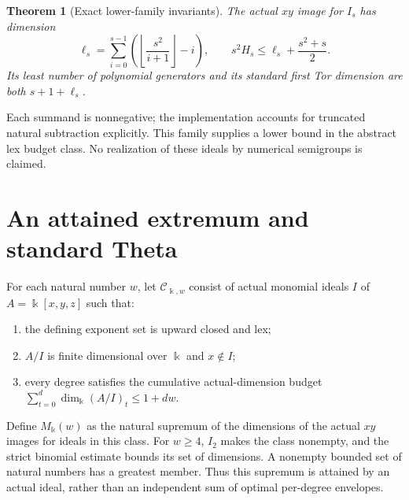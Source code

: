 \documentclass[11pt,a4paper]{article}
\newtheorem{theorem}{Theorem}[section]
\newcommand{\kk}{\Bbbk}
\begin{document}
\begin{theorem}[Exact lower-family invariants]\label{thm:lower}
The actual $xy$ image for $I_s$ has dimension
\[
 \ell_s=\sum_{i=0}^{s-1}
 \left(\left\lfloor\frac{s^2}{i+1}\right\rfloor-i\right),\qquad
 s^2H_s\le\ell_s+\frac{s^2+s}{2}.
\]
Its least number of polynomial generators and its standard first Tor dimension
are both $s+1+\ell_s$.
\end{theorem}
Each summand is nonnegative; the implementation accounts for truncated natural
subtraction explicitly. This family supplies a lower bound in the abstract
lex budget class. No realization of these ideals by numerical semigroups is
claimed.

\section{An attained extremum and standard Theta}\label{sec:theta}
For each natural number $w$, let $\mathcal C_{\kk,w}$ consist of actual monomial
ideals $I$ of $A=\kk[x,y,z]$ such that:
\begin{enumerate}
\item the defining exponent set is upward closed and lex;
\item $A/I$ is finite dimensional over $\kk$ and $x\notin I$;
\item every degree satisfies the cumulative actual-dimension budget
$\sum_{t=0}^{d}\dim_{\kk}(A/I)_t\le1+dw$.
\end{enumerate}
Define $M_{\kk}(w)$ as the natural supremum of the dimensions of the actual
$xy$ images for ideals in this class. For $w\ge4$, $I_2$ makes the class nonempty,
and the strict binomial estimate bounds its set of dimensions. A nonempty
bounded set of natural numbers has a greatest member. Thus this supremum is
attained by an actual ideal, rather than an independent sum of optimal
per-degree envelopes.
\end{document}
